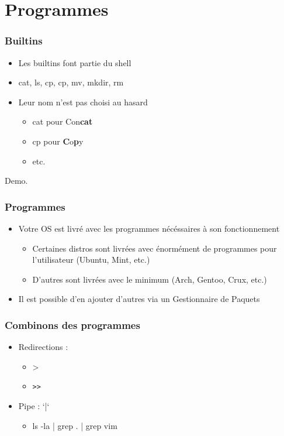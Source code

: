 \section{Programmes}
\begin{frame}
    \frametitle{Builtins}
    \begin{itemize}
	\item Les builtins font partie du shell
	\item cat, ls, cp, cp, mv, mkdir, rm
	\item Leur nom n'est pas choisi au hasard
	\begin{itemize}
            \item cat pour Con\textbf{cat}
	    \item cp pour \textbf{C}o\textbf{p}y
	    \item etc.
	\end{itemize}
    \end{itemize}
\end{frame}

\begin{frame}
        Demo.
\end{frame}

\begin{frame}
    \frametitle{Programmes}
    \begin{itemize}
	\item Votre OS est livré avec les programmes nécéssaires à son fonctionnement
    \begin{itemize}
        \item Certaines distros sont livrées avec énormément de programmes pour
                l'utilisateur (Ubuntu, Mint, etc.)
        \item D'autres sont livrées avec le minimum (Arch, Gentoo, Crux, etc.)
    \end{itemize}
	\item Il est possible d'en ajouter d'autres via un Gestionnaire de Paquets
    \end{itemize}
\end{frame}

\begin{frame}[fragile]
    \frametitle{Combinons des programmes}
    \begin{itemize}
	\item Redirections :
	\begin{itemize}
	    \item >
        \item \begin{verbatim}>>\end{verbatim}
	\end{itemize}
	\item Pipe : `|`
	\begin{itemize}
	    \item ls -la | grep . | grep vim
	\end{itemize}
    \end{itemize}
\end{frame}


